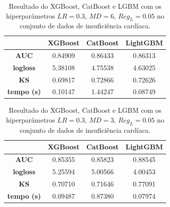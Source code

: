\begin{table}[H]
\label{res:car:7}
\centering
\begin{tabular}{|c|c|c|c|}
\hline
	& \textbf{XGBoost} &\textbf{CatBoost} & \textbf{LightGBM} \\
\hline
\textbf{AUC}	& 0.84909&	0.86433	&0.86313\\
\hline
\textbf{logloss}	& 5.38108&	4.75538	&4.63025\\
\hline
\textbf{KS}	&0.69817	&0.72866	&0.72626\\
\hline
\textbf{tempo (s)}	&0.10147	&1.44247	&0.08749 \\
\hline
\end{tabular}
\caption{Resultado do XGBoost, CatBoost e LGBM com os hiperparâmetros $LR=0.3$, $MD=6$, $Reg_L=0.05$ no conjunto de dados de insuficiência cardíaca.}
\end{table}

\begin{table}[H]
\label{res:car:8}
\centering
\begin{tabular}{|c|c|c|c|}
\hline
	& \textbf{XGBoost} &\textbf{CatBoost} & \textbf{LightGBM} \\
\hline
\textbf{AUC}	& 0.85355&	0.85823	&0.88545\\
\hline
\textbf{logloss}	& 5.25594	&5.00566	&4.00453\\
\hline
\textbf{KS}	&0.70710	&0.71646	&0.77091\\
\hline
\textbf{tempo (s)}	&0.09487	&0.87380	&0.07974 \\
\hline
\end{tabular}
\caption{Resultado do XGBoost, CatBoost e LGBM com os hiperparâmetros $LR=0.3$, $MD=3$, $Reg_L=0.05$ no conjunto de dados de insuficiência cardíaca.}
\end{table}

